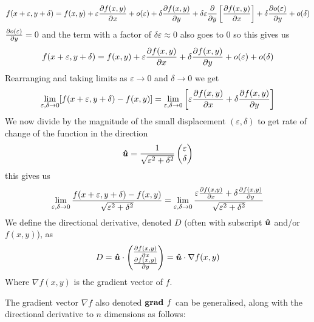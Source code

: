 \documentclass{article}
\renewcommand{\grad}{\nabla}
\begin{document}
    \[f(x + \varepsilon, y + \delta) = f(x, y) + \varepsilon\pdv{f(x, y)}{x} + o(\varepsilon) + \delta\pdv{f(x, y)}{y} + \delta\varepsilon\pdv{y}\left[\pdv{f(x, y)}{x}\right] + \delta\pdv{o(\varepsilon)}{y} + o(\delta)\]
    \(\pdv{o(\varepsilon)}{y} = 0\) and the term with a factor of \(\delta\varepsilon\approx 0\) also goes to 0 so this gives us
    \[f(x + \varepsilon, y + \delta) = f(x, y) + \varepsilon\pdv{f(x, y)}{x} + \delta\pdv{f(x, y)}{y} + o(\varepsilon) + o(\delta)\]
    Rearranging and taking limits as \(\varepsilon\to 0\) and \(\delta\to 0\) we get
    \[\lim_{\varepsilon,\delta\to 0}[f(x + \varepsilon, y + \delta) - f(x, y)] = \lim_{\varepsilon,\delta\to 0}\left[\varepsilon\pdv{f(x, y)}{x} + \delta\pdv{f(x, y)}{y}\right]\]
    We now divide by the magnitude of the small displacement \((\varepsilon, \delta)\) to get rate of change of the function in the direction
    \[
        \bm{\hat{u}} = \frac{1}{\sqrt{\varepsilon^2 + \delta^2}}
        \begin{pmatrix}
            \varepsilon \\ \delta
        \end{pmatrix}
    \]
    this gives us
    \[\lim_{\varepsilon,\delta\to 0}\frac{f(x + \varepsilon, y + \delta) - f(x, y)}{\sqrt{\varepsilon^2 + \delta^2}} = \lim_{\varepsilon,\delta\to 0}\frac{\varepsilon\pdv{f(x, y)}{x} + \delta\pdv{f(x, y)}{y}}{\sqrt{\varepsilon^2 + \delta^2}}\]
    We define the directional derivative, denoted \(D\) (often with subscript \(\bm{\hat{u}}\) and/or \(f(x, y)\)), as
    \[
        D = \vh u\cdot
        \begin{pmatrix}
            \pdv{f(x, y)}{x} \\ \pdv{f(x, y)}{y}
        \end{pmatrix}
        = \vh u\cdot \grad f(x, y)
    \]
    Where \(\grad f(x, y)\) is the gradient vector of \(f\).
    
    The gradient vector \(\grad f\) also denoted \(\text{\textbf{grad }}f\) can be generalised, along with the directional derivative to \(n\) dimensions as follows:
    
\end{document}
